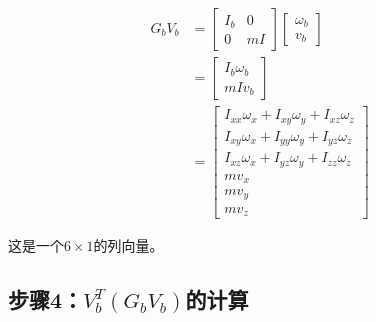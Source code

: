 \documentclass[12pt,a4paper]{article}
\begin{document}
\begin{align}
G_b V_b &= \begin{bmatrix}
I_b & 0 \\
0 & mI
\end{bmatrix} \begin{bmatrix} \omega_b \\ v_b \end{bmatrix} \\
&= \begin{bmatrix}
I_b \omega_b \\
mI v_b
\end{bmatrix} \\
&= \begin{bmatrix}
I_{xx}\omega_x + I_{xy}\omega_y + I_{xz}\omega_z \\
I_{xy}\omega_x + I_{yy}\omega_y + I_{yz}\omega_z \\
I_{xz}\omega_x + I_{yz}\omega_y + I_{zz}\omega_z \\
mv_x \\
mv_y \\
mv_z
\end{bmatrix}
\end{align}

这是一个$6 \times 1$的列向量。

\subsection{步骤4：$V_b^T (G_b V_b)$的计算}
\end{document}
